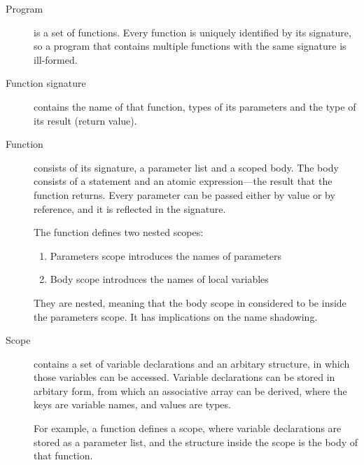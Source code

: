 \documentclass [a4paper] {article}
\begin{document}
\begin {description}

\item [Program] is a set of functions. Every function is uniquely identified by
its signature, so a program that contains multiple functions with the same
signature is ill-formed.

\item [Function signature] contains the name of that function, types of its
parameters and the type of its result (return value).

\item [Function] consists of its signature, a parameter list and a scoped body.
The body consists of a statement and an atomic expression---the result that the
function returns. Every parameter can be passed either by value or by reference,
and it is reflected in the signature.

The function defines two nested scopes:
\begin {enumerate}
\item Parameters scope introduces the names of parameters
\item Body scope introduces the names of local variables
\end {enumerate}

They are nested, meaning that the body scope in considered to be inside the
parameters scope. It has implications on the name shadowing.

\item [Scope] contains a set of variable declarations and an arbitary structure,
in which those variables can be accessed. Variable declarations can be stored in
arbitary form, from which an associative array can be derived, where the keys
are variable names, and values are types.

For example, a function defines a scope, where variable declarations are
stored as a parameter list, and the structure inside the scope is the body
of that function.

\end {description}
\end{document}
